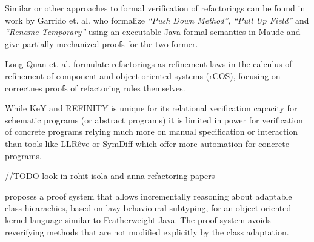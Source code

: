 Similar or other approaches to formal verification of refactorings can be found in work by
Garrido et. al. \cite{garrido2006formal} who formalize \emph{``Push Down Method''},
\emph{``Pull Up Field''} and \emph{``Rename Temporary''} using an executable
Java formal semantics in Maude and give partially mechanized proofs for the two former.

Long Quan et. al. \cite{DBLP:conf/isola/QuanQL08} formulate refactorings as refinement
laws in the calculus of refinement of component and object-oriented systems (rCOS),
focusing on correctnes proofs of refactoring rules themselves.

While KeY and REFINITY is unique for its relational verification capacity for
schematic programs (or abstract programs) it is limited in power for verification
of concrete programs relying much more on manual specification or interaction \cite{DBLP:conf/aplas/Steinhofel20}
than tools like LLRêve \cite{DBLP:journals/jar/KieferKU18} or SymDiff \cite{DBLP:conf/cav/LahiriHKR12}
which offer more automation for concrete programs.



//TODO look in rohit isola and anna refactoring papers

\cite{dovland:adaptableclass2015} proposes a proof system that allows
incrementally reasoning about adaptable class hiearachies, based on
lazy behavioural subtyping, for 
an object-oriented kernel language similar to Featherweight Java.  The
proof system avoids reverifying methods that are not modified
explicitly by the class adaptation.




